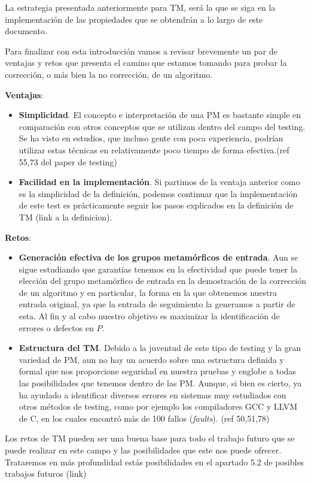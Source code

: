 La estrategia presentada anteriormente para TM, será la que se siga en la implementación de las propiedades que se obtendrán a lo largo de este documento. \newline

Para finalizar con esta introducción vamos a revisar brevemente un par de ventajas y retos que presenta el camino que estamos tomando para probar la corrección, o más bien la no corrección, de un algoritmo. \newline

\textbf{Ventajas}:
\begin{itemize}
    \item \textbf{Simplicidad}. El concepto e interpretación de una PM es bastante simple en comparación con otros conceptos que se utilizan dentro del campo del testing. Se ha visto en estudios, que incluso gente con poca experiencia, podrían utilizar estas técnicas en relativamente poco tiempo de forma efectiva.(ref 55,73 del paper de testing)
    \item \textbf{Facilidad en la implementación}. Si partimos de la ventaja anterior como es la simplicidad de la definición, podemos continuar que la implementación de este test es prácticamente seguir los pasos explicados en la definición de TM (link a la definicion).
\end{itemize}

\vspace{10pt}

\textbf{Retos}:
\begin{itemize}
    \item \textbf{Generación efectiva de los grupos metamórficos de entrada}. Aun se sigue estudiando que garantías tenemos en la efectividad que puede tener la elección del grupo metamórfico de entrada en la demostración de la corrección de un algoritmo y en particular, la forma en la que obtenemos nuestra entrada original, ya que la entrada de seguimiento la generamos a partir de esta. Al fin y al cabo nuestro objetivo es maximizar la identificación de errores o defectos en $P$.
    \item \textbf{Estructura del TM}. Debido a la juventud de este tipo de testing y la gran variedad de PM, aun no hay un acuerdo sobre una estructura definida y formal que nos proporcione seguridad en nuestra pruebas y englobe a todas las posibilidades que tenemos dentro de las PM. Aunque, si bien es cierto, ya ha ayudado a identificar diversos errores en sistemas muy estudiados con otros métodos de testing, como por ejemplo los compiladores GCC y LLVM de C, en los cuales encontró más de 100 fallos (\textit{faults}). (ref 50,51,78)
\end{itemize}

Los retos de TM pueden ser una buena base para todo el trabajo futuro que se puede realizar en este campo y las posibilidades que este nos puede ofrecer. Trataremos en más profundidad estás posibilidades en el apartado 5.2 de posibles trabajos futuros (link)



